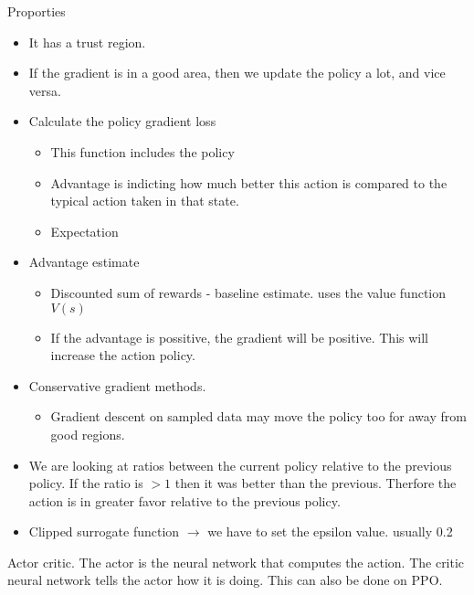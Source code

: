 \documentclass[a4paper]{article}
\begin{document}
Proporties
\begin{itemize}
	\item It has a trust region. 
	\item If the gradient is in a good area, then we update the policy a lot, and vice versa. 
	\item Calculate the policy gradient loss 
	\begin{itemize}
		\item This function includes the policy
		\item Advantage is indicting how much better this action is compared to the typical action taken in that state. 
		\item Expectation
	\end{itemize}
\item Advantage estimate
	\begin{itemize}
		\item Discounted sum of rewards - baseline estimate. uses the value function $ V(s) $
		\item If the advantage is possitive, the gradient will be positive. This will increase the action policy.
	\end{itemize}
\item Conservative gradient methods.
	\begin{itemize}
		\item Gradient descent on sampled data may move the policy too for  away from good regions.
	\end{itemize}
\item We are looking at ratios between the current policy relative to the previous policy. If the ratio is $ >1 $ then it was better than the previous. Therfore the action is in greater favor relative to the previous policy. 
\item Clipped surrogate function $ \rightarrow $ we have to set the epsilon value. usually 0.2
\end{itemize}
Actor critic. The actor is the neural network that computes the action. The critic neural network tells the actor how it is doing. This can also be done on PPO. 
\end{document}
